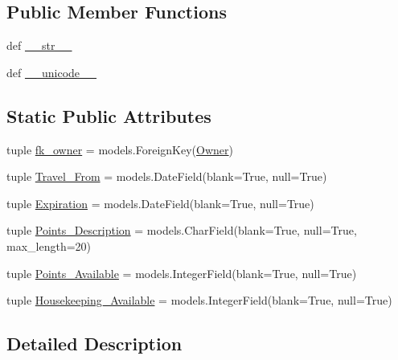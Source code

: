 \subsection*{Public Member Functions}
\begin{DoxyCompactItemize}
\item 
def \hyperlink{classowners__point__manager_1_1models_1_1Owners__Points__Status_a3945e2fcc78675b8d2c2b3d1c476a69b}{\-\_\-\-\_\-str\-\_\-\-\_\-}
\item 
def \hyperlink{classowners__point__manager_1_1models_1_1Owners__Points__Status_a93565cb0ce0d03c14bdac0651ca4f031}{\-\_\-\-\_\-unicode\-\_\-\-\_\-}
\end{DoxyCompactItemize}
\subsection*{Static Public Attributes}
\begin{DoxyCompactItemize}
\item 
tuple \hyperlink{classowners__point__manager_1_1models_1_1Owners__Points__Status_a8ffb5a3f42d5c780ef974bb11236604a}{fk\-\_\-owner} = models.\-Foreign\-Key(\hyperlink{classreservation__manager_1_1models_1_1Owner}{Owner})
\item 
tuple \hyperlink{classowners__point__manager_1_1models_1_1Owners__Points__Status_a7b4e92424e34aa30a96e50756d6211ab}{Travel\-\_\-\-From} = models.\-Date\-Field(blank=True, null=True)
\item 
tuple \hyperlink{classowners__point__manager_1_1models_1_1Owners__Points__Status_af05df99f421ca8947ef360570d74c4e9}{Expiration} = models.\-Date\-Field(blank=True, null=True)
\item 
tuple \hyperlink{classowners__point__manager_1_1models_1_1Owners__Points__Status_adba6f512bb65caa1c93d611e3fc99f3b}{Points\-\_\-\-Description} = models.\-Char\-Field(blank=True, null=True, max\-\_\-length=20)
\item 
tuple \hyperlink{classowners__point__manager_1_1models_1_1Owners__Points__Status_a315ff2863e17358bafdecf464f37d19d}{Points\-\_\-\-Available} = models.\-Integer\-Field(blank=True, null=True)
\item 
tuple \hyperlink{classowners__point__manager_1_1models_1_1Owners__Points__Status_af2fd0b1cada128d283b30ac63654d65d}{Housekeeping\-\_\-\-Available} = models.\-Integer\-Field(blank=True, null=True)
\end{DoxyCompactItemize}


\subsection{Detailed Description}


